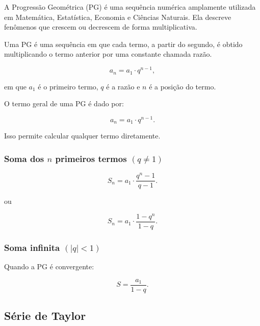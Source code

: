 \documentclass[
  letterpaper,
  DIV=11,
  numbers=noendperiod]{scrreprt}
\begin{document}
A Progressão Geométrica (PG) é uma sequência numérica amplamente
utilizada em Matemática, Estatística, Economia e Ciências Naturais. Ela
descreve fenômenos que crescem ou decrescem de forma multiplicativa.

\begin{tcolorbox}[enhanced jigsaw, colback=white, leftrule=.75mm, colbacktitle=quarto-callout-warning-color!10!white, breakable, titlerule=0mm, bottomtitle=1mm, title=\textcolor{quarto-callout-warning-color}{\faExclamationTriangle}\hspace{0.5em}{Definição:}, colframe=quarto-callout-warning-color-frame, toprule=.15mm, opacityback=0, bottomrule=.15mm, opacitybacktitle=0.6, arc=.35mm, toptitle=1mm, rightrule=.15mm, coltitle=black, left=2mm]

Uma PG é uma sequência em que cada termo, a partir do segundo, é obtido
multiplicando o termo anterior por uma constante chamada razão.

\[a_n = a_1 \cdot q^{n-1},\]

em que \(a_1\) é o primeiro termo, \(q\) é a razão e \(n\) é a posição
do termo.

\end{tcolorbox}

O termo geral de uma PG é dado por:

\[a_n = a_1 \cdot q^{n-1}.\]

Isso permite calcular qualquer termo diretamente.

\subsubsection{\texorpdfstring{Soma dos \(n\) primeiros termos
\((q \neq 1)\)}{Soma dos n primeiros termos (q \textbackslash neq 1)}}\label{soma-dos-n-primeiros-termos-q-neq-1}

\[S_n = a_1 \cdot \frac{q^n - 1}{q - 1}.\]

ou

\[S_n = a_1 \cdot \frac{1 - q^n}{1 - q}.\]

\subsubsection{\texorpdfstring{Soma infinita
\((|q| < 1)\)}{Soma infinita (\textbar q\textbar{} \textless{} 1)}}\label{soma-infinita-q-1}

Quando a PG é convergente:

\[S = \frac{a_1}{1 - q}.\]

\subsection{Série de Taylor}\label{suxe9rie-de-taylor}
\end{document}

